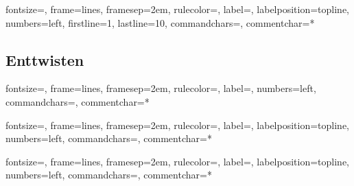 \documentclass[a4paper, notitlepage, 12pt]{scrartcl}
\begin{document}
%
{fontsize=\footnotesize,
	frame=lines,  %
	framesep=2em, %
	rulecolor=\color{Gray},
	label=,
	labelposition=topline,
	numbers=left,
	firstline=1,
	lastline=10,
	commandchars=\|\(\), %
	commentchar=*        %
}
\begingroup
{}
\endgroup

\subsection{Enttwisten}
%
{fontsize=\footnotesize,
	frame=lines,  %
	framesep=2em, %
	rulecolor=\color{Gray},
	label=,
	numbers=left,
	commandchars=\|\(\), %
	commentchar=*        %
}
\begingroup
{}
\endgroup

%
{fontsize=\footnotesize,
	frame=lines,  %
	framesep=2em, %
	rulecolor=\color{Gray},
	label=,
	labelposition=topline,
	numbers=left,
	commandchars=\|\(\), %
	commentchar=*        %
}
\begingroup
{}
\endgroup

%
{fontsize=\footnotesize,
	frame=lines,  %
	framesep=2em, %
	rulecolor=\color{Gray},
	label=,
	labelposition=topline,
	numbers=left,
	commandchars=\|\(\), %
	commentchar=*        %
}
\begingroup
{}
\endgroup
\end{document}

